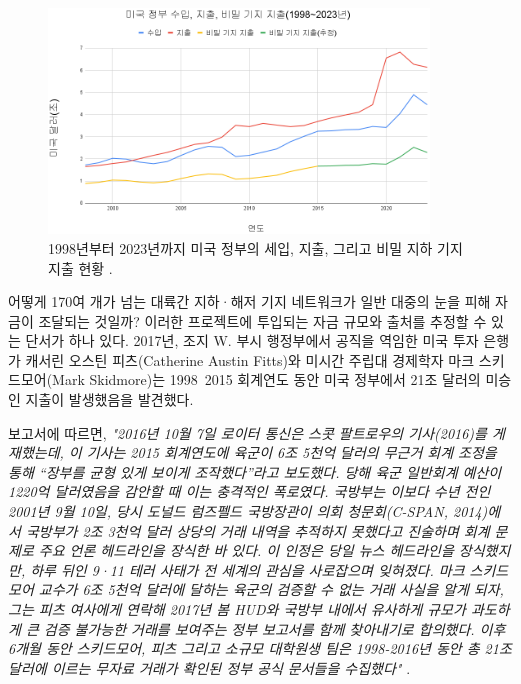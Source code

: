 \documentclass[10pt,twocolumn,letterpaper]{article}
\begin{document}
\begin{figure}[t]
\begin{center}
\includegraphics[width=0.9\textwidth]{govkor.png}
\end{center}
   \caption{1998년부터 2023년까지 미국 정부의 세입, 지출, 그리고 비밀 지하 기지 지출 현황 \cite{19}.}
   \label{fig:9}
\end{figure}

어떻게 170여 개가 넘는 대륙간 지하·해저 기지 네트워크가 일반 대중의 눈을 피해 자금이 조달되는 것일까? 이러한 프로젝트에 투입되는 자금 규모와 출처를 추정할 수 있는 단서가 하나 있다. 2017년, 조지 W. 부시 행정부에서 공직을 역임한 미국 투자 은행가 캐서린 오스틴 피츠(Catherine Austin Fitts)와 미시간 주립대 경제학자 마크 스키드모어(Mark Skidmore)는 1998~2015 회계연도 동안 미국 정부에서 21조 달러의 미승인 지출이 발생했음을 발견했다\cite{11,12,13}.

보고서에 따르면, \textit{"2016년 10월 7일 로이터 통신은 스콧 팔트로우의 기사(2016)를 게재했는데, 이 기사는 2015 회계연도에 육군이 6조 5천억 달러의 무근거 회계 조정을 통해 “장부를 균형 있게 보이게 조작했다”라고 보도했다. 당해 육군 일반회계 예산이 1220억 달러였음을 감안할 때 이는 충격적인 폭로였다. 국방부는 이보다 수년 전인 2001년 9월 10일, 당시 도널드 럼즈펠드 국방장관이 의회 청문회(C-SPAN, 2014)에서 국방부가 2조 3천억 달러 상당의 거래 내역을 추적하지 못했다고 진술하며 회계 문제로 주요 언론 헤드라인을 장식한 바 있다. 이 인정은 당일 뉴스 헤드라인을 장식했지만, 하루 뒤인 9·11 테러 사태가 전 세계의 관심을 사로잡으며 잊혀졌다. 마크 스키드모어 교수가 6조 5천억 달러에 달하는 육군의 검증할 수 없는 거래 사실을 알게 되자, 그는 피츠 여사에게 연락해 2017년 봄 HUD와 국방부 내에서 유사하게 규모가 과도하게 큰 검증 불가능한 거래를 보여주는 정부 보고서를 함께 찾아내기로 합의했다. 이후 6개월 동안 스키드모어, 피츠 그리고 소규모 대학원생 팀은 1998-2016년 동안 총 21조 달러에 이르는 무자료 거래가 확인된 정부 공식 문서들을 수집했다"} \cite{12}.
\end{document}
